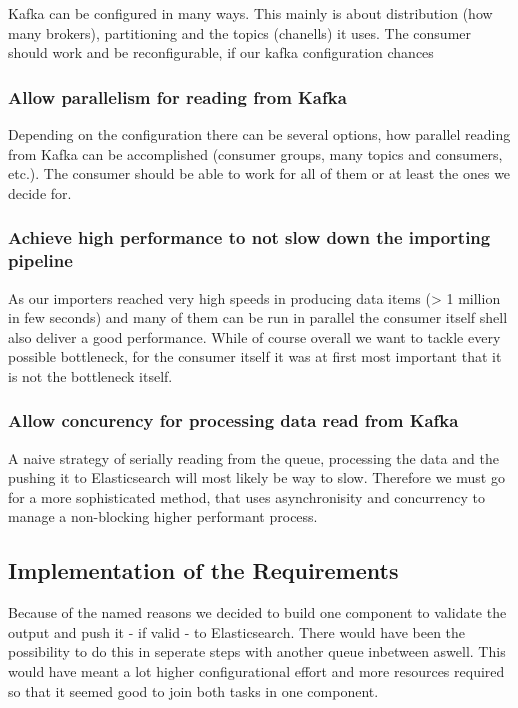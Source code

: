Kafka can be configured in many ways. This mainly is about distribution
(how many brokers), partitioning and the topics (chanells) it uses. The
consumer should work and be reconfigurable, if our kafka configuration
chances

\subsubsection{Allow parallelism for reading from Kafka}\label{reading-from-kafka}

Depending on the configuration there can be several options, how
parallel reading from Kafka can be accomplished (consumer groups, many
topics and consumers, etc.). The consumer should be able to work for all
of them or at least the ones we decide for.

\subsubsection{Achieve high performance to not slow down the importing
pipeline}\label{achieve-high-performance-to-not-slow-down-the-importing-pipeline}

As our importers reached very high speeds in producing data items
(\textgreater{} 1 million in few seconds) and many of them can be run in
parallel the consumer itself shell also deliver a good performance.
While of course overall we want to tackle every possible bottleneck, for
the consumer itself it was at first most important that it is not the
bottleneck itself.

\subsubsection{Allow concurency for processing data read from
Kafka}\label{allow-concurency-for-processing-data-read-from-kafka}

A naive strategy of serially reading from the queue, processing the data
and the pushing it to Elasticsearch will most likely be way to slow.
Therefore we must go for a more sophisticated method, that uses
asynchronisity and concurrency to manage a non-blocking higher
performant process.

\subsection{Implementation of the
Requirements}\label{implementation-of-the-requirements}

Because of the named reasons we decided to build one component to
validate the output and push it - if valid - to Elasticsearch. There
would have been the possibility to do this in seperate steps with
another queue inbetween aswell. This would have meant a lot higher
configurational effort and more resources required so that it seemed
good to join both tasks in one component.

